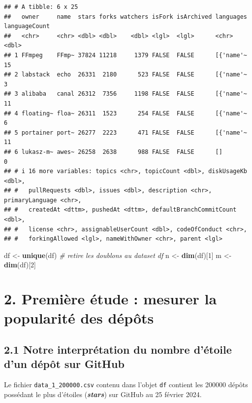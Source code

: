 \documentclass[
]{article}
\newenvironment{Shaded}{\begin{snugshade}}{\end{snugshade}}
\newcommand{\CommentTok}[1]{\textcolor[rgb]{0.56,0.35,0.01}{\textit{#1}}}
\newcommand{\DecValTok}[1]{\textcolor[rgb]{0.00,0.00,0.81}{#1}}
\newcommand{\FunctionTok}[1]{\textcolor[rgb]{0.13,0.29,0.53}{\textbf{#1}}}
\newcommand{\NormalTok}[1]{#1}
\newcommand{\OtherTok}[1]{\textcolor[rgb]{0.56,0.35,0.01}{#1}}
\begin{document}
\begin{verbatim}
## # A tibble: 6 x 25
##   owner     name  stars forks watchers isFork isArchived languages languageCount
##   <chr>     <chr> <dbl> <dbl>    <dbl> <lgl>  <lgl>      <chr>             <dbl>
## 1 FFmpeg    FFmp~ 37824 11218     1379 FALSE  FALSE      [{'name'~            15
## 2 labstack  echo  26331  2180      523 FALSE  FALSE      [{'name'~             3
## 3 alibaba   canal 26312  7356     1198 FALSE  FALSE      [{'name'~            11
## 4 floating~ floa~ 26311  1523      254 FALSE  FALSE      [{'name'~             6
## 5 portainer port~ 26277  2223      471 FALSE  FALSE      [{'name'~            11
## 6 lukasz-m~ awes~ 26258  2638      988 FALSE  FALSE      []                    0
## # i 16 more variables: topics <chr>, topicCount <dbl>, diskUsageKb <dbl>,
## #   pullRequests <dbl>, issues <dbl>, description <chr>, primaryLanguage <chr>,
## #   createdAt <dttm>, pushedAt <dttm>, defaultBranchCommitCount <dbl>,
## #   license <chr>, assignableUserCount <dbl>, codeOfConduct <chr>,
## #   forkingAllowed <lgl>, nameWithOwner <chr>, parent <lgl>
\end{verbatim}

\begin{Shaded}
\begin{Highlighting}[]
\NormalTok{df }\OtherTok{\textless{}{-}} \FunctionTok{unique}\NormalTok{(df) }\CommentTok{\# retire les doublons au dataset df}
\NormalTok{n }\OtherTok{\textless{}{-}} \FunctionTok{dim}\NormalTok{(df)[}\DecValTok{1}\NormalTok{]}
\NormalTok{m }\OtherTok{\textless{}{-}} \FunctionTok{dim}\NormalTok{(df)[}\DecValTok{2}\NormalTok{]}
\end{Highlighting}
\end{Shaded}

\section{2. Première étude : mesurer la popularité des
dépôts}\label{premiuxe8re-uxe9tude-mesurer-la-popularituxe9-des-duxe9puxf4ts}

\subsection{2.1 Notre interprétation du nombre d'étoile d'un dépôt sur
GitHub}\label{notre-interpruxe9tation-du-nombre-duxe9toile-dun-duxe9puxf4t-sur-github}

Le fichier \texttt{data\_1\_200000.csv} contenu dans l'objet \texttt{df}
contient les 200000 dépôts possédant le plus d'étoiles
(\textbf{\emph{stars}}) sur GitHub au 25 février 2024.
\end{document}
